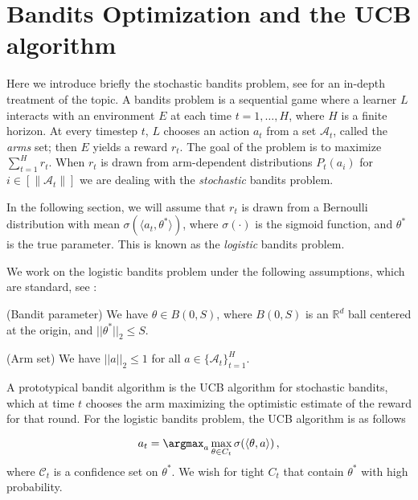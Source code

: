 
\section{Bandits Optimization and the UCB algorithm}

Here we introduce briefly the stochastic bandits problem, see \citep{lattimore2020bandit} for an in-depth treatment of the topic. A bandits problem is a sequential game where a learner $L$ interacts with an environment $E$ at each time $t = 1, \ldots, H$, where $H$ is a finite horizon. At every timestep $t$, $L$ chooses an action $a_t$ from a set $\mathcal{A}_t$, called the \textit{arms} set; then $E$ yields a reward $r_t$. The goal of the problem is to maximize $\sum_{t = 1}^H r_t$. When $r_t$ is drawn from arm-dependent distributions $P_t(a_i)$ for $i \in [\| \mathcal{A}_t \| ]$ we  are dealing with the \textit{stochastic} bandits problem. 

In the following section, we will assume that $r_t$ is drawn from a Bernoulli distribution with mean $\sigma( \langle a_t, \theta^*  \rangle)$, where $\sigma(\cdot )$ is the sigmoid function, and $\theta^*$ is the true parameter. This is known as the \textit{logistic} bandits problem.

We work on the logistic bandits problem under the following assumptions, which are standard, see \citep{filippi2010parametric}:

\begin{assumption}{(Bandit parameter)}
We have $\theta \in B(0, S)$, where $B(0, S)$ is an $\mathbb{R}^d$ ball centered at the origin, and   $|| \theta^*||_2 \leq S$.
\end{assumption}

\begin{assumption}{(Arm set)}
We have $||a||_2 \leq 1$ for all $a \in \{ \mathcal{A}_t \}_{t = 1}^H$.
\end{assumption}

A prototypical bandit algorithm is the UCB algorithm for stochastic bandits, which at time $t$ chooses the arm maximizing the optimistic estimate of the reward for that round. For the logistic bandits problem, the UCB algorithm is as follows 

\begin{equation}
    a_t = \argmax_{a} \max_{\theta \in C_t} \sigma(\langle \theta, a \rangle) \,,
\end{equation}
where $\mathcal{C}_t$ is a confidence set on $\theta^*$. We wish for tight $C_t$ that contain $\theta^*$ with high probability. 

